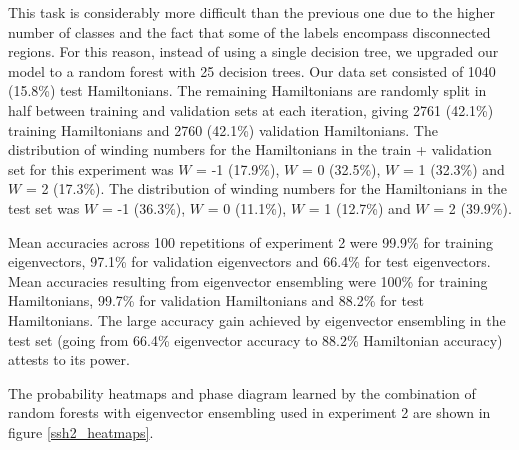 \documentclass[fleqn,10pt]{wlscirep}
\begin{document}
This task is considerably more difficult than the previous one due to the higher number of classes and the fact that some of the labels encompass disconnected regions. For this reason, instead of using a single decision tree, we upgraded our model to a random forest \cite{Breiman2001} with 25 decision trees. Our data set consisted of 1040 (15.8\%) test Hamiltonians. The remaining Hamiltonians are randomly split in half between training and validation sets at each iteration, giving 2761 (42.1\%) training Hamiltonians and 2760 (42.1\%) validation Hamiltonians. The distribution of winding numbers for the Hamiltonians in the train + validation set for this experiment was $W$ = -1 (17.9\%), $W$ = 0 (32.5\%), $W$ = 1 (32.3\%) and $W$ = 2 (17.3\%). The distribution of winding numbers for the Hamiltonians in the test set was $W$ = -1 (36.3\%), $W$ = 0 (11.1\%), $W$ = 1 (12.7\%) and $W$ = 2 (39.9\%).

Mean accuracies across 100 repetitions of experiment 2 were 99.9\% for training eigenvectors, 97.1\% for validation eigenvectors and 66.4\% for test eigenvectors. Mean accuracies resulting from eigenvector ensembling were 100\% for training Hamiltonians, 99.7\% for validation Hamiltonians and 88.2\% for test Hamiltonians. The large accuracy gain achieved by eigenvector ensembling in the test set (going from 66.4\% eigenvector accuracy to 88.2\% Hamiltonian accuracy) attests to its power.

The probability heatmaps and phase diagram learned by the combination of random forests with eigenvector ensembling used in experiment 2 are shown in figure \ref{ssh2_heatmaps}.
\end{document}
